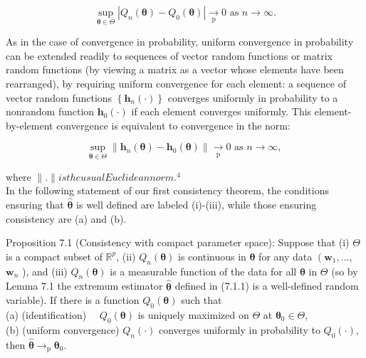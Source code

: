 \documentclass[10pt]{article}
\begin{document}
\begin{equation*}
\sup _{\boldsymbol{\theta} \in \Theta}\left|Q_{n}(\boldsymbol{\theta})-Q_{0}(\boldsymbol{\theta})\right| \underset{\mathrm{p}}{\rightarrow} 0 \text { as } n \rightarrow \infty . \tag{7.2.1}
\end{equation*}


As in the case of convergence in probability, uniform convergence in probability can be extended readily to sequences of vector random functions or matrix random functions (by viewing a matrix as a vector whose elements have been rearranged), by requiring uniform convergence for each element: a sequence of vector random functions $\left\{\mathbf{h}_{n}(\cdot)\right\}$ converges uniformly in probability to a nonrandom function $\mathbf{h}_{0}(\cdot)$ if each element converges uniformly. This element-by-element convergence is equivalent to convergence in the norm:


\begin{equation*}
\sup _{\boldsymbol{\theta} \in \Theta}\left\|\mathbf{h}_{n}(\boldsymbol{\theta})-\mathbf{h}_{0}(\boldsymbol{\theta})\right\| \underset{\mathrm{p}}{\rightarrow} 0 \text { as } n \rightarrow \infty \text {, } \tag{7.2.2}
\end{equation*}


where $\|$.$\| is the usual Euclidean norm. { }^{4}$\\
In the following statement of our first consistency theorem, the conditions ensuring that $\hat{\boldsymbol{\theta}}$ is well defined are labeled (i)-(iii), while those ensuring consistency are (a) and (b).

Proposition 7.1 (Consistency with compact parameter space): Suppose that (i) $\Theta$ is a compact subset of $\mathbb{R}^{p}$, (ii) $Q_{n}(\boldsymbol{\theta})$ is continuous in $\boldsymbol{\theta}$ for any data $\left(\mathbf{w}_{1}, \ldots\right.$, $\mathbf{w}_{n}$ ), and (iii) $Q_{n}(\boldsymbol{\theta})$ is a measurable function of the data for all $\boldsymbol{\theta}$ in $\Theta$ (so by Lemma 7.1 the extremum estimator $\hat{\boldsymbol{\theta}}$ defined in (7.1.1) is a well-defined random variable). If there is a function $Q_{0}(\boldsymbol{\theta})$ such that\\
(a) (identification) $\quad Q_{0}(\boldsymbol{\theta})$ is uniquely maximized on $\Theta$ at $\boldsymbol{\theta}_{0} \in \Theta$,\\
(b) (uniform convergence) $Q_{n}(\cdot)$ converges uniformly in probability to $Q_{0}(\cdot)$, then $\hat{\boldsymbol{\theta}} \rightarrow_{\mathrm{p}} \boldsymbol{\theta}_{0}$.
\end{document}
